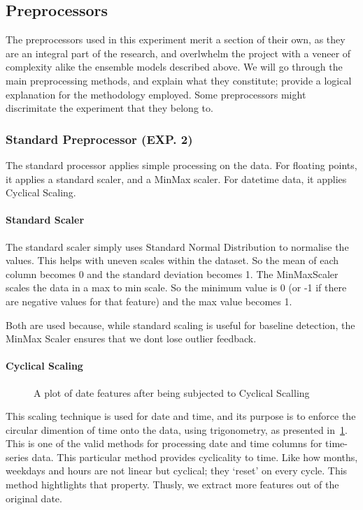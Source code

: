 \subsection{Preprocessors}
The preprocessors used in this experiment merit a section of their own, as they are an integral part of the research, and overlwhelm the project with a veneer of complexity alike the ensemble models described above.
We will go through the main preprocessing methods, and explain what they constitute; provide a logical explanation for the methodology employed.
Some preprocessors might discrimitate the experiment that they belong to.

\subsubsection{Standard Preprocessor (EXP. 2)}
The standard processor applies simple processing on the data. For floating points, it applies a standard scaler, and a MinMax scaler. For datetime data, it applies Cyclical Scaling.

\paragraph{Standard Scaler}
The standard scaler simply uses Standard Normal Distribution to normalise the values. This helps with uneven scales within the dataset. So the mean of each column becomes 0 and the standard deviation becomes 1. The MinMaxScaler scales the data in a max to min scale. So the minimum value is 0 (or -1 if there are negative values for that feature) and the max value becomes 1.

Both are used because, while standard scaling is useful for baseline detection, the MinMax Scaler ensures that we dont lose outlier feedback.

\paragraph{Cyclical Scaling}
\begin{figure}[htbp]
    \centering
    \resizebox{0.89\textwidth}{!}{
        
    }
    \caption{A plot of date features after being subjected to Cyclical Scalling}
    \label{fig:cyclicalScalling}
\end{figure}
This scaling technique is used for date and time, and its purpose is to enforce the circular dimention of time onto the data, using trigonometry, as presented in~\ref{fig:cyclicalScalling}.
This is one of the valid methods for processing date and time columns for time-series data.
This particular method provides cyclicality to time. Like how months, weekdays and hours are not linear but cyclical; they `reset' on every cycle. This method hightlights that property. Thusly, we extract more features out of the original date.

